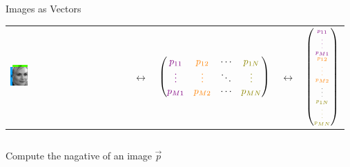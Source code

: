\documentclass[10pt,aspectratio=169,usenames,dvipsnames,handout]{beamer}
\begin{document}
\begin{frame}[fragile]{Images as Vectors}
\begin{center}
	\begin{tabular}{m{2.5cm} m{1cm} c m{1cm} c}
	\includegraphics[width=0.15\textwidth]{images/vectormatrix/ImageToVector} &
	$\longleftrightarrow$ &
	$\begin{pmatrix}
		\textcolor{violet}{p_{11}} & \textcolor{orange}{p_{12}} & \cdots & \textcolor{olive}{p_{1N}} \\
		\textcolor{violet}{\vdots} & \textcolor{orange}{\vdots} & \ddots & \textcolor{olive}{\vdots} \\
		\textcolor{violet}{p_{M1}} & \textcolor{orange}{p_{M2}} & \cdots &  \textcolor{olive}{p_{MN}} \\
	\end{pmatrix}$ &
	$\longleftrightarrow$ &
	$\tiny{\begin{pmatrix}
		\textcolor{violet}{p_{11}} \\
		\textcolor{violet}{\vdots} \\
		\textcolor{violet}{p_{M1}} \\
		\textcolor{orange}{p_{12}} \\
		\textcolor{orange}{\vdots} \\
		\textcolor{orange}{p_{M2}} \\
		\vdots \\
		\textcolor{olive}{p_{1N}} \\
		\textcolor{olive}{\vdots} \\
		\textcolor{olive}{p_{MN}} \\
	\end{pmatrix}}$
\end{tabular}
\begin{columns}[T,onlytextwidth]
	\column{\textwidth}
	\begin{block}{Compute the nagative of an image $\vec{p}$}
		\begin{minipage}{0.45\textwidth}
			\hspace{1cm}

\end{minipage}
\end{block}
\end{columns}
\end{center}
\end{frame}
\end{document}
